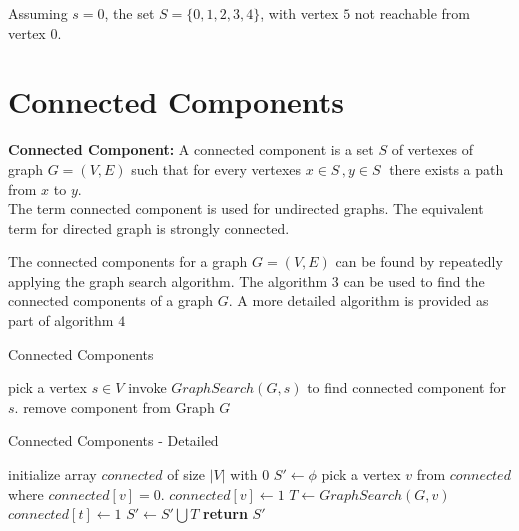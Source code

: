 \documentclass{article}
\begin{document}
Assuming $s=0$, the set $S=\{0,1,2,3,4\}$, with vertex $5$ not reachable from vertex $0$.

\section{Connected Components}

\textbf{Connected Component:} A connected component is a set $S$ of vertexes of graph $G=(V,E)$ such that for every vertexes $x\in S\,,y\in S\;$ there exists a path from $x$ to $y$.\\

The term connected component is used for undirected graphs. The equivalent term for directed graph is strongly connected.

The connected components for a graph $G=(V,E)$ can be found by repeatedly applying the graph search algorithm.  The algorithm $3$ can be used to find the connected components of a graph $G$.  A more detailed algorithm is provided as part of algorithm $4$

\begin{algorithm}
\caption{Connected Components}\label{A algorithm to find the connected components of a graph $G$}
\begin{algorithmic}[1]
	\Repeat
		\State pick a vertex $s \in V$
		\State invoke $GraphSearch(G,s)$ to find connected component for $s$.
		\State remove component from Graph $G$
\EndProcedure
\end{algorithmic}
\end{algorithm}


\begin{algorithm}
\caption{Connected Components - Detailed}\label{A algorithm to find the connected components of a graph $G$}
\begin{algorithmic}[1]
	\State initialize array $connected$ of size $|V|$ with 0
	\State $S'\gets \phi$
	\Repeat
		\State pick a vertex $v$ from $connected$ where $connected[v] = 0$.
		\State $connected[v] \gets 1$
		\State $T\gets GraphSearch(G,v)$
			\State $connected[t] \gets 1$
		\EndFor
		\State $S'\gets S'\bigcup T$
	\State \textbf{return} $S'$
\EndProcedure
\end{algorithmic}
\end{algorithm}
\end{document}

